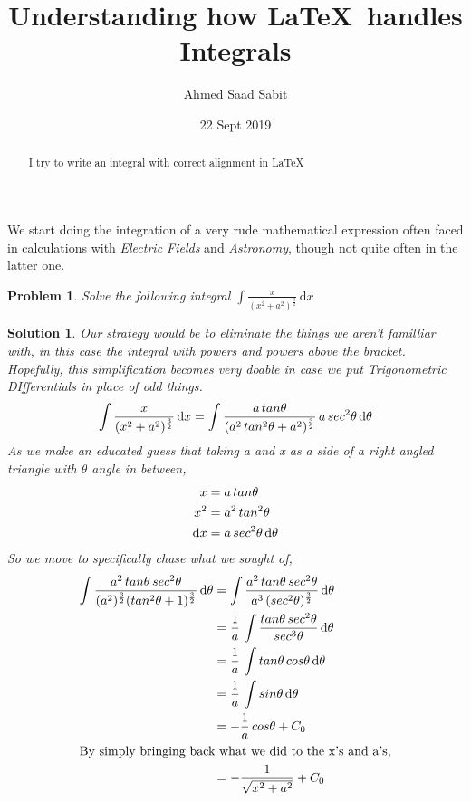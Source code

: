 \documentclass{article}
\title{\textsf{Understanding how \LaTeX\  handles Integrals}}
\author{Ahmed Saad Sabit}
\date{22 Sept 2019}
\newtheorem{prob}{\textsf{Problem}}
\newtheorem{sol}{\textsf{Solution}}
\theoremstyle{definition}
\begin{document}
\maketitle

\begin{abstract}
I try to write an integral with correct alignment in \LaTeX
\\		
\end{abstract}
We start doing the integration of a very rude mathematical expression often faced in calculations with \emph{Electric Fields} and \emph{Astronomy}, though not quite often in the latter one.
\theoremstyle{definition}
\begin{prob}
 Solve the following integral $\int\frac{x}{(x^2+a^2)^{\frac{3}{2}}}\, \mathrm{d}x  $
\end{prob}
\begin{sol}
Our strategy would be to eliminate the things we aren't familliar with, in this case the integral with \emph{powers and powers above the bracket}. Hopefully, this simplification becomes very doable in case we put \emph{Trigonometric DIfferentials} in place of odd things.
\begin{align}
\int\frac{x}{(x^2+a^2)^ {\frac{3}{2}}} \, \mathrm{d}x \notag = \int\frac{a\,tan\theta}{ (a^2\, tan^2\theta + a^2)^ {\frac{3}{2}} } \, a\, sec^2\theta \,\mathrm{d}\theta
\end{align}
As we make an educated guess that taking a and x as a side of a right angled triangle with $\theta$ angle in between,
\begin{align}
x & = a \, tan\theta  \notag \\
 x^2 & = a^2 \, tan^2\theta  \notag \\
 \mathrm{d}x& = a \,sec^2 \theta\, \mathrm{d}\theta \notag
\end{align}
So we move to specifically chase what we sought of,\\
\begin{align}
\int \frac{a^2 \, tan\theta \,sec^2\theta}
    		{ (a^2)^{\frac{3}{2}} (tan^2\theta + 1)^{\frac{3}{2}} } \, \mathrm{d}\theta	\notag 
&=\int \frac{a^2 \, tan\theta \,sec^2\theta}
			{a^3 \, (sec^2\theta)^ {\frac{3}{2}} }	\, \mathrm{d}\theta	\notag \\
&= \frac{1}{a} \, \int \frac{tan\theta \, sec^2\theta}
								{sec^3\theta} \,\mathrm{d}\theta		\notag \\
&= \frac{1}{a} \, \int tan\theta \, cos\theta 	\, \mathrm{d}\theta \notag \\
%
&=\frac{1}{a} \, \int sin\theta \, \mathrm{d}\theta \notag	\\
&= - \frac{1}{a} \, cos\theta + C_0 \\
\intertext{By simply bringing back what we did to the x's and a's,}
&= - \frac{1}{\sqrt{x^2 + a^2}} + C_0
\end{align}
\end{sol}
\end{document}
